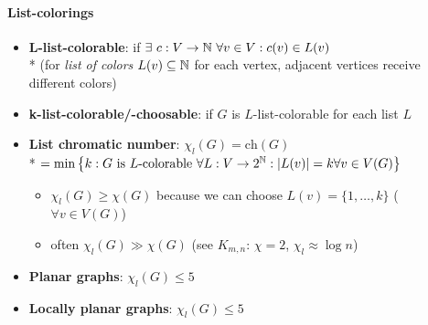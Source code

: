 \paragraph{List-colorings}
\begin{itemize}
  \item \textbf{L-list-colorable}: if $ \exists \ c: V \to \mathbb{N} \ \forall v \in V : c(v) \in L(v) $ \\*
  (for \emph{list of colors} $ L(v) \subseteq \mathbb{N} $ for each vertex, adjacent vertices receive different colors) 
  \item \textbf{k-list-colorable/-choosable}: if $ G $ is $ L $-list-colorable for each list $ L $
  \item \textbf{List chromatic number}: $ \chi_l(G) = \text{ch}(G) $ \\* $ = \min\left\{ k : G \text{ is $ L $-colorable } \forall L: V \to 2^{\mathbb{N}}: \vert L(v) \vert = k \forall v \in V(G) \right\} $
  \begin{itemize}
    \item $ \chi_l(G) \geq \chi(G) $ because we can choose $ L(v) = \{ 1, \dots, k \} $ ($ \forall v \in V(G) $) 
    \item often $ \chi_l(G) \gg \chi(G) $ (see $ K_{m,n} $: $ \chi = 2 $, $ \chi_l \approx \log n $)
  \end{itemize}
  \item \textbf{Planar graphs}: $ \chi_l(G) \leq 5 $
  \item \textbf{Locally planar graphs}: $ \chi_l(G) \leq 5 $
\end{itemize}